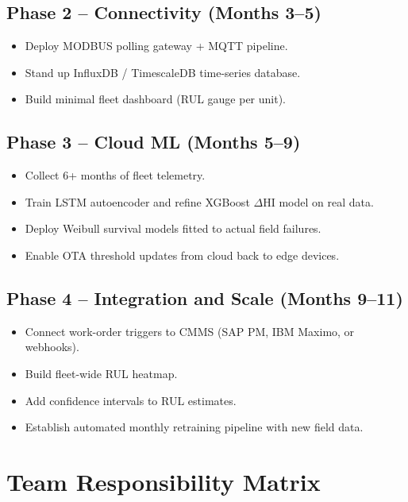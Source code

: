 \documentclass[12pt,a4paper]{article}
\begin{document}
\subsection{Phase 2 -- Connectivity (Months 3--5)}
\begin{itemize}[noitemsep]
  \item Deploy MODBUS polling gateway + MQTT pipeline.
  \item Stand up InfluxDB / TimescaleDB time-series database.
  \item Build minimal fleet dashboard (RUL gauge per unit).
\end{itemize}

\subsection{Phase 3 -- Cloud ML (Months 5--9)}
\begin{itemize}[noitemsep]
  \item Collect 6+ months of fleet telemetry.
  \item Train LSTM autoencoder and refine XGBoost $\Delta$HI model on real data.
  \item Deploy Weibull survival models fitted to actual field failures.
  \item Enable OTA threshold updates from cloud back to edge devices.
\end{itemize}

\subsection{Phase 4 -- Integration and Scale (Months 9--11)}
\begin{itemize}[noitemsep]
  \item Connect work-order triggers to CMMS (SAP PM, IBM Maximo, or webhooks).
  \item Build fleet-wide RUL heatmap.
  \item Add confidence intervals to RUL estimates.
  \item Establish automated monthly retraining pipeline with new field data.
\end{itemize}

\section{Team Responsibility Matrix}
\end{document}
